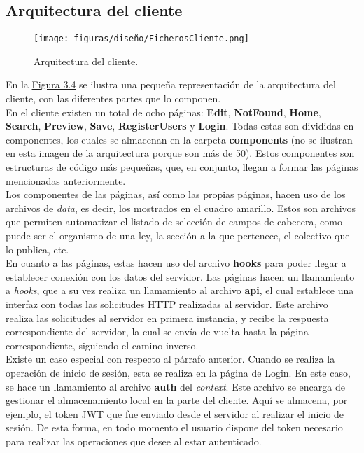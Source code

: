 \subsection{Arquitectura del cliente}

\begin{figure}[H]
\centerline{\texttt{[image: figuras/diseño/FicherosCliente.png]}}
\caption{Arquitectura del cliente.}
\label{enlaceArquitecturaCliente}
\end{figure}

En la \hyperref[enlaceArquitecturaCliente]{Figura 3.4} se ilustra una pequeña representación de la arquitectura del cliente, con las diferentes partes que lo componen.
\\

En el cliente existen un total de ocho páginas: {\bf Edit}, {\bf NotFound}, {\bf Home}, {\bf Search}, {\bf Preview}, {\bf Save}, {\bf RegisterUsers} y {\bf Login}. Todas estas son divididas en componentes, los cuales se almacenan en la carpeta {\bf components} (no se ilustran en esta imagen de la arquitectura porque son más de 50). Estos componentes son estructuras de código más pequeñas, que, en conjunto, llegan a formar las páginas mencionadas anteriormente.
\\

Los componentes de las páginas, así como las propias páginas, hacen uso de los archivos de {\it data}, es decir, los mostrados en el cuadro amarillo. Estos son archivos que permiten automatizar el listado de selección de campos de cabecera, como puede ser el organismo de una ley, la sección a la que pertenece, el colectivo que lo publica, etc.
\\

En cuanto a las páginas, estas hacen uso del archivo {\bf hooks} para poder llegar a establecer conexión con los datos del servidor. Las páginas hacen un llamamiento a {\it hooks}, que a su vez realiza un llamamiento al archivo {\bf api}, el cual establece una interfaz con todas las solicitudes HTTP realizadas al servidor. Este archivo realiza las solicitudes al servidor en primera instancia, y recibe la respuesta correspondiente del servidor, la cual se envía de vuelta hasta la página correspondiente, siguiendo el camino inverso.
\\

Existe un caso especial con respecto al párrafo anterior. Cuando se realiza la operación de inicio de sesión, esta se realiza en la página de Login. En este caso, se hace un llamamiento al archivo {\bf auth} del {\it context}. Este archivo se encarga de gestionar el almacenamiento local en la parte del cliente. Aquí se almacena, por ejemplo, el token JWT que fue enviado desde el servidor al realizar el inicio de sesión. De esta forma, en todo momento el usuario dispone del token necesario para realizar las operaciones que desee al estar autenticado.